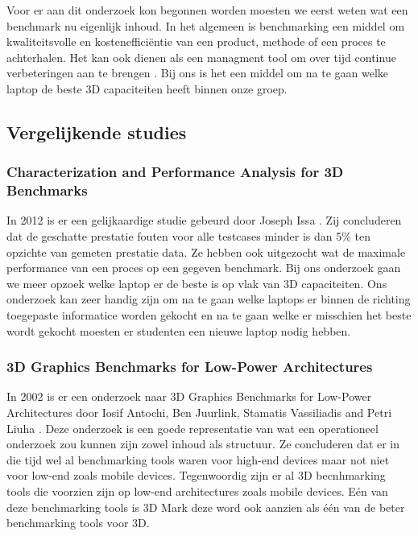 Voor er aan dit onderzoek kon begonnen worden moesten we eerst weten wat een benchmark nu eigenlijk inhoud. In het algemeen is benchmarking een middel om kwaliteitsvolle en kostenefficiëntie van een product, methode of een proces te achterhalen. Het kan ook dienen als een managment tool om over tijd continue verbeteringen aan te brengen \citep{PIBenchmarking}. Bij ons is het een middel om na te gaan welke laptop de beste 3D capaciteiten heeft binnen onze groep.

\subsection{Vergelijkende studies}
\subsubsection{Characterization and Performance Analysis for 3D Benchmarks }
In 2012 is er een gelijkaardige studie gebeurd door Joseph Issa \citep{CPUGPU12}. Zij concluderen dat de geschatte prestatie fouten voor alle testcases minder is dan 5\% ten opzichte van gemeten prestatie data. Ze hebben ook uitgezocht wat de maximale performance van een proces op een gegeven benchmark. Bij ons onderzoek gaan we meer opzoek welke laptop er de beste is op vlak van 3D capaciteiten. Ons onderzoek kan zeer handig zijn om na te gaan welke laptops er binnen de richting toegepaste informatice worden gekocht en na te gaan welke er misschien het beste wordt gekocht moesten er studenten een nieuwe laptop nodig hebben.

\subsubsection{3D Graphics Benchmarks for Low-Power Architectures}
In 2002 is er een onderzoek naar 3D Graphics Benchmarks for Low-Power Architectures door Iosif Antochi, Ben Juurlink, Stamatis Vassiliadis and Petri Liuha \citep{lowPower}. Deze onderzoek is een goede representatie van wat een operationeel onderzoek zou kunnen zijn zowel inhoud als structuur. Ze concluderen dat er in die tijd wel al benchmarking tools waren voor high-end devices maar not niet voor low-end zoals mobile devices. Tegenwoordig zijn er al 3D becnhmarking tools die voorzien zijn op low-end architectures zoals mobile devices. Eén van deze benchmarking tools is 3D Mark deze word ook aanzien als één van de beter benchmarking tools voor 3D.  